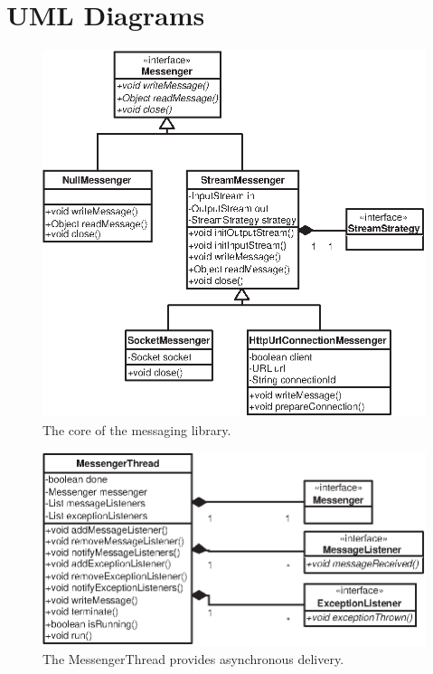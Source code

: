 \documentclass{article}
\begin{document}
\section{UML Diagrams}

\begin{figure}[!hbp]
\includegraphics{new.eps}
\caption{The core of the messaging library.} \label{new}
\end{figure}


\begin{figure}[!hbp]
\includegraphics{mess.eps}
\caption{The MessengerThread provides asynchronous delivery.} \label{mess}
\end{figure}
\end{document}
